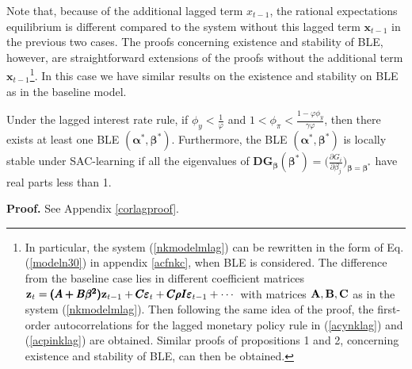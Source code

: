 Note that, because of the additional lagged term $x_{t-1}$, the rational expectations equilibrium is different compared to the system without this lagged term ${\pmb x}_{t-1}$ in the previous two cases. The proofs concerning existence and stability of BLE, however, are straightforward extensions of the proofs without the additional term ${\pmb x}_{t-1}$\footnote{In particular, the system (\ref{nkmodelmlag}) can be rewritten in the form of Eq. (\ref{modeln30}) in appendix \ref{acfnkc}, when BLE is considered. The difference from the baseline case lies in different coefficient matrices $ {\bf z}_{t}=\pmb{(A+B\beta^2)}{\bf z}_{t-1}+\pmb{C\varepsilon}_t+\pmb{C\rho I \varepsilon}_{t-1}+\cdots$ with matrices ${\bf A, B, C}$ as in the system (\ref{nkmodelmlag}). Then following the same idea of the proof, the first-order autocorrelations for the lagged monetary policy rule in (\ref{acynklag}) and (\ref{acpinklag}) are obtained. Similar proofs of propositions 1 and 2, concerning existence and stability of BLE, can then be obtained.}. In this case we have similar results on the existence and stability on BLE as in the baseline model.
\begin{cor}
\label{cor:lag} Under the lagged interest rate rule, if $\phi_y<\frac{1}{\varphi}$ and $1<\phi_\pi<\frac{1-\varphi\phi_y}{\gamma\varphi}$, then there
exists at least one BLE $(\pmb\alpha^*,\pmb\beta^*)$. Furthermore, the BLE $(\pmb\alpha^*,{\pmb\beta}^*)$ is locally
stable under SAC-learning if all the eigenvalues of $\pmb D\pmb G_{\pmb\beta}(\pmb\beta^*)=\Big(\frac{\partial G_i}{\partial \beta_j}\Big)_{{\pmb\beta}={\pmb\beta}^*}$ have real parts less than 1.
\end{cor}
\textbf{Proof.} See Appendix \ref{corlagproof}.

